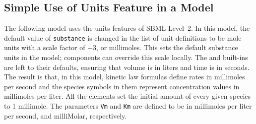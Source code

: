 \documentclass[10pt,twocolumntoc]{cekarticle}
\begin{document}
\subsection{Simple Use of Units Feature in a Model}
\label{apdx:units-eg}

The following model uses the units features of SBML Level~2.  In
this model, the default value of \texttt{substance} is changed in
the list of unit definitions to be mole units with a scale factor
of $-3$, or millimoles.  This sets the default substance units in
the model; components can override this scale locally.  The
 and  built-ins are left to their
defaults, ensuring that volume is in liters and time is in
seconds.  The result is that, in this model, kinetic law formulas
define rates in millimoles per second and the species symbols in
them represent concentration values in millimoles per liter.  All
the  elements set the initial amount of every given
species to 1 millimole.  The parameters \texttt{Vm} and
\texttt{Km} are defined to be in millimoles per liter per second,
and milliMolar, respectively.
\end{document}
